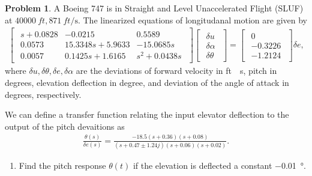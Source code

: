 \documentclass[10pt]{article}
\theoremstyle{definition}
\newtheorem{prob}{Problem}[section]
\newenvironment{subprob}%
{\renewcommand{\theenumi}{\alph{enumi}}\renewcommand{\labelenumi}{(\theenumi)}\begin{enumerate}}%
{\end{enumerate}}%
\begin{document}
\begin{prob}
    A Boeing 747 is in Straight and Level Unaccelerated Flight (SLUF) at \( \SI{40000}{ft}, \SI{871}{ft \per \second}\).
    The linearized equations of longitudanal motion are given by
    \begin{align}
        \begin{bmatrix}
            \begin{array}{ccc}
                s + 0.0828 & -0.0215 & 0.5589 \\
                0.0573 & 15.3348s + 5.9633 & -15.0685s \\
                0.0057 & 0.1425s + 1.6165 & s^2 + 0.0438s
            \end{array}
        \end{bmatrix}
        \begin{bmatrix}
            \begin{array}{c}
                \delta u \\ \delta \alpha \\ \delta \theta
            \end{array}
        \end{bmatrix}
        =
        \begin{bmatrix}
            \begin{array}{c}
                0 \\ -0.3226 \\ -1.2124
            \end{array}
        \end{bmatrix}
        \delta e ,
    \end{align}
    where \( \delta u, \delta \theta, \delta e, \delta \alpha\) are the deviations of forward velocity in \si{ft \per \second}, pitch in degrees, elevation deflection in degree, and deviation of the angle of attack in degrees, respectively.

We can define a transfer function relating the input elevator deflection to the output of the pitch devaitions as
\begin{align}
    \frac{\theta(s)}{\delta e(s)} = \frac{-18.5 (s + 0.36) (s+0.08)}{(s + 0.47 \pm 1.24 j)(s+0.06)(s+0.02)} .
\end{align}

\begin{subprob}
    \item Find the pitch response \( \theta (t) \) if the elevation is deflected a constant \SI{-0.01}{\degree}.
\end{subprob}
\end{prob}
\end{document}
